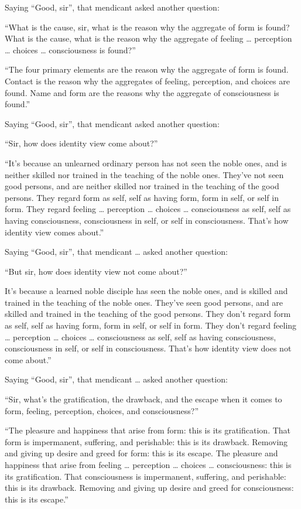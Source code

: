 \documentclass[12pt,openany]{book}%
\begin{document}
Saying “Good, sir”, that mendicant asked another question: 

“What is the cause, sir, what is the reason why the aggregate of form is found? What is the cause, what is the reason why the aggregate of feeling … perception … choices … consciousness is found?” 

“The four primary elements are the reason why the aggregate of form is found. Contact is the reason why the aggregates of feeling, perception, and choices are found. Name and form are the reasons why the aggregate of consciousness is found.” 

Saying “Good, sir”, that mendicant asked another question: 

“Sir, how does identity view come about?” 

“It’s because an unlearned ordinary person has not seen the noble ones, and is neither skilled nor trained in the teaching of the noble ones. They’ve not seen good persons, and are neither skilled nor trained in the teaching of the good persons. They regard form as self, self as having form, form in self, or self in form. They regard feeling … perception … choices … consciousness as self, self as having consciousness, consciousness in self, or self in consciousness. That’s how identity view comes about.” 

Saying “Good, sir”, that mendicant … asked another question: 

“But sir, how does identity view not come about?” 

It’s because a learned noble disciple has seen the noble ones, and is skilled and trained in the teaching of the noble ones. They’ve seen good persons, and are skilled and trained in the teaching of the good persons. They don’t regard form as self, self as having form, form in self, or self in form. They don’t regard feeling … perception … choices … consciousness as self, self as having consciousness, consciousness in self, or self in consciousness. That’s how identity view does not come about.” 

Saying “Good, sir”, that mendicant … asked another question: 

“Sir, what’s the gratification, the drawback, and the escape when it comes to form, feeling, perception, choices, and consciousness?” 

“The pleasure and happiness that arise from form: this is its gratification. That form is impermanent, suffering, and perishable: this is its drawback. Removing and giving up desire and greed for form: this is its escape. The pleasure and happiness that arise from feeling … perception … choices … consciousness: this is its gratification. That consciousness is impermanent, suffering, and perishable: this is its drawback. Removing and giving up desire and greed for consciousness: this is its escape.” 
\end{document}
